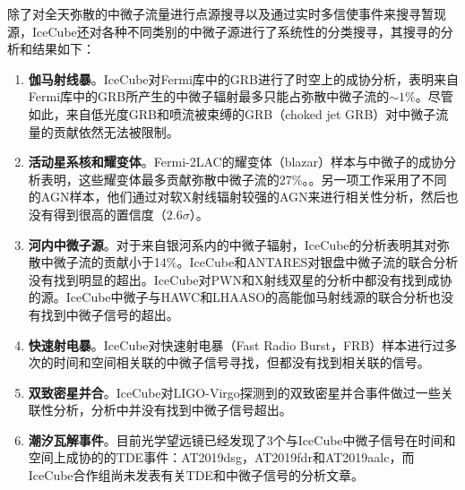 除了对全天弥散的中微子流量进行点源搜寻以及通过实时多信使事件来搜寻暂现源，IceCube还对各种不同类别的中微子源进行了系统性的分类搜寻，其搜寻的分析和结果如下：

\begin{enumerate}
    \item \textbf{伽马射线暴}。IceCube对Fermi库中的GRB进行了时空上的成协分析，表明来自Fermi库中的GRB所产生的中微子辐射最多只能占弥散中微子流的$\sim 1\%$\cite{IceCube_GRB_prompt:2014, IceCube_GRB:2022}。尽管如此，来自低光度GRB和喷流被束缚的GRB（choked jet GRB）\cite{Choked_GRB:2015}对中微子流量的贡献依然无法被限制。

    \item \textbf{活动星系核和耀变体}。Fermi-2LAC的耀变体（blazar）样本与中微子的成协分析表明，这些耀变体最多贡献弥散中微子流的27\%。\cite{IceCube_Fermi_2LAC_blazars:2016}。另一项工作采用了不同的AGN样本，他们通过对软X射线辐射较强的AGN来进行相关性分析，然后也没有得到很高的置信度（$2.6\sigma$）\cite{IceCube_AGN_core:2021}。

    \item \textbf{河内中微子源}。对于来自银河系内的中微子辐射，IceCube的分析表明其对弥散中微子流的贡献小于14\%\cite{IceCube_galactic:2017}。IceCube和ANTARES对银盘中微子流的联合分析没有找到明显的超出\cite{ANTARES_IceCube_galactic:2018}。IceCube对PWN和X射线双星的分析中都没有找到成协的源\cite{IceCube_PWN:2020, IceCube_X_binaries:2022}。IceCube中微子与HAWC\cite{IceCube_HAWC:2019}和LHAASO\cite{Huang_IceCube_LHAASO:2021, IceCube_LHAASO:2022}的高能伽马射线源的联合分析也没有找到中微子信号的超出。

    \item \textbf{快速射电暴}。IceCube对快速射电暴（Fast Radio Burst，FRB）样本进行过多次的时间和空间相关联的中微子信号寻找\cite{IceCube_FRB:2017, IceCube_FRB:2019, IceCube_FRB:2022}，但都没有找到相关联的信号。

    \item \textbf{双致密星并合}。IceCube对LIGO-Virgo探测到的双致密星并合事件做过一些关联性分析\cite{GW170817_MM, IceCube_ANTARES_Auger_GW170817, IceCube_BBH:2020}，分析中并没有找到中微子信号超出。

    \item \textbf{潮汐瓦解事件}。目前光学望远镜已经发现了3个与IceCube中微子信号在时间和空间上成协的的TDE事件\cite{TDE_MM:2023}：AT2019dsg\cite{AT2019dsg:2020}，AT2019fdr\cite{AT2019fdr:2021}和AT2019aalc，而IceCube合作组尚未发表有关TDE和中微子信号的分析文章。

\end{enumerate}


